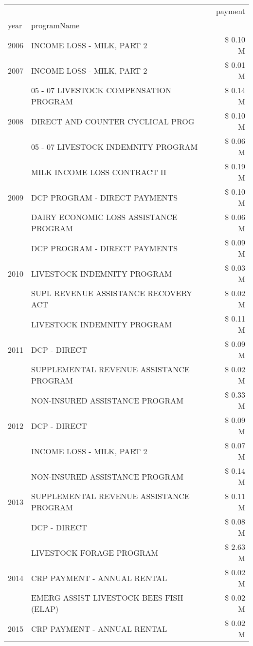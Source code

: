 \begin{tabular}{llr}
\toprule
 &  & payment \\
year & programName &  \\
\midrule
2006 & INCOME LOSS - MILK, PART 2 & \$ 0.10 M \\
\cline{1-3}
2007 & INCOME LOSS - MILK, PART 2 & \$ 0.01 M \\
\cline{1-3}
\multirow[t]{3}{*}{2008} & 05 - 07 LIVESTOCK COMPENSATION PROGRAM & \$ 0.14 M \\
 & DIRECT AND COUNTER CYCLICAL PROG & \$ 0.10 M \\
 & 05 - 07 LIVESTOCK INDEMNITY PROGRAM & \$ 0.06 M \\
\cline{1-3}
\multirow[t]{3}{*}{2009} & MILK INCOME LOSS CONTRACT II & \$ 0.19 M \\
 & DCP PROGRAM - DIRECT PAYMENTS & \$ 0.10 M \\
 & DAIRY ECONOMIC LOSS ASSISTANCE PROGRAM & \$ 0.06 M \\
\cline{1-3}
\multirow[t]{3}{*}{2010} & DCP PROGRAM - DIRECT PAYMENTS & \$ 0.09 M \\
 & LIVESTOCK INDEMNITY PROGRAM & \$ 0.03 M \\
 & SUPL REVENUE ASSISTANCE RECOVERY ACT & \$ 0.02 M \\
\cline{1-3}
\multirow[t]{3}{*}{2011} & LIVESTOCK INDEMNITY PROGRAM & \$ 0.11 M \\
 & DCP - DIRECT & \$ 0.09 M \\
 & SUPPLEMENTAL REVENUE ASSISTANCE PROGRAM & \$ 0.02 M \\
\cline{1-3}
\multirow[t]{3}{*}{2012} & NON-INSURED ASSISTANCE PROGRAM & \$ 0.33 M \\
 & DCP - DIRECT & \$ 0.09 M \\
 & INCOME LOSS - MILK, PART 2 & \$ 0.07 M \\
\cline{1-3}
\multirow[t]{3}{*}{2013} & NON-INSURED ASSISTANCE PROGRAM & \$ 0.14 M \\
 & SUPPLEMENTAL REVENUE ASSISTANCE PROGRAM & \$ 0.11 M \\
 & DCP - DIRECT & \$ 0.08 M \\
\cline{1-3}
\multirow[t]{3}{*}{2014} & LIVESTOCK FORAGE PROGRAM & \$ 2.63 M \\
 & CRP PAYMENT - ANNUAL RENTAL & \$ 0.02 M \\
 & EMERG ASSIST LIVESTOCK BEES FISH (ELAP) & \$ 0.02 M \\
\cline{1-3}
\multirow[t]{3}{*}{2015} & CRP PAYMENT - ANNUAL RENTAL & \$ 0.02 M \\

\end{tabular}
